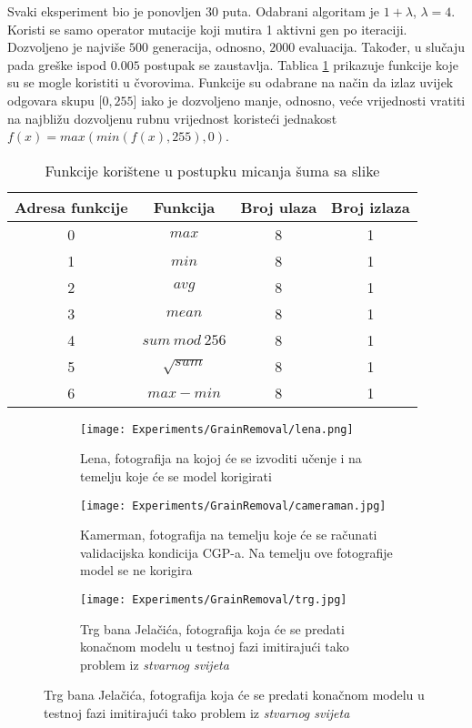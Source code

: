Svaki eksperiment bio je ponovljen 30 puta.
Odabrani algoritam je $1 + \lambda$, $\lambda = 4$.
Koristi se samo operator mutacije koji mutira 1 aktivni gen po iteraciji.
Dozvoljeno je najviše $500$ generacija, odnosno, $2000$ evaluacija.
Također, u slučaju pada greške ispod $0.005$ postupak se zaustavlja.
Tablica \ref{table:sp_function_set} prikazuje funkcije koje su se mogle koristiti u čvorovima.
Funkcije su odabrane na način da izlaz uvijek odgovara skupu $[0, 255$] iako je dozvoljeno manje, odnosno, veće vrijednosti vratiti na najbližu dozvoljenu rubnu vrijednost koristeći jednakost $f(x) = max(min(f(x), 255), 0)$.

\begin{table}
	\centering
	\begin{tabular}{||c c c c||}
		\hline
		Adresa funkcije & Funkcija & Broj ulaza & Broj izlaza \\ [0.5ex]
		\hline \hline
		0 & $max$ & 8 & 1\\
		1 & $min$ & 8 & 1\\ 
		2 & $avg$ & 8 & 1\\ 
		3 & $mean$ & 8 & 1\\ 
		4 & $sum\ mod\ 256$ & 8 & 1\\ 
		5 & $\sqrt{sum}$ & 8 & 1\\ 
		6 & $max - min$ & 8 & 1\\ [1ex]
		\hline
	\end{tabular}
	\caption{Funkcije korištene u postupku micanja šuma sa slike}
	\label{table:sp_function_set}
\end{table}

\begin{figure}
	\caption{Fotografije na koje će biti primjenjen šum korištene u fazi učenja, validacijskoj i testnoj fazi}
	\begin{subfigure}[t]{0.45\textwidth}
		\texttt{[image: Experiments/GrainRemoval/lena.png]}
		\caption{Lena, fotografija na kojoj će se izvoditi učenje i na temelju koje će se model korigirati}
		\label{fig:sp_train_sample}
	\end{subfigure}
	\begin{subfigure}[t]{0.45\textwidth}
		\texttt{[image: Experiments/GrainRemoval/cameraman.jpg]}
		\caption{Kamerman, fotografija na temelju koje će se računati validacijska kondicija CGP-a. Na temelju ove fotografije model se ne korigira}
		\label{fig:sp_val_sample}
	\end{subfigure}
	\begin{subfigure}[t]{0.45\textwidth}
		\texttt{[image: Experiments/GrainRemoval/trg.jpg]}
		\caption{Trg bana Jelačića, fotografija koja će se predati konačnom modelu u testnoj fazi imitirajući tako problem iz \emph{stvarnog svijeta}}
		\label{fig:sp_test_sample}
	\end{subfigure}
	\label{fig:sp_samples}
\end{figure}

